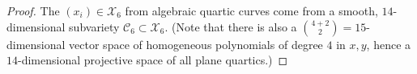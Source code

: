 \documentclass[10pt,a4paper]{amsart}
\newcommand{\A}{\mathbb{A}}
\newcommand{\ZZ}{\mathbb{Z}}
\begin{document}
\begin{proof}

%

%
The $(x_i) \in \mathcal{X}_6$ from algebraic quartic curves come from a smooth, $14$-dimensional 
subvariety $\mathcal{C}_6 \subset \mathcal{X}_6$.  (Note that there is also a $\binom{4 + 2}{2} = 15$-dimensional vector space
of homogeneous polynomials of degree $4$ in $x,y$, hence a $14$-dimensional projective space of all plane quartics.)


\end{proof}
\end{document}
